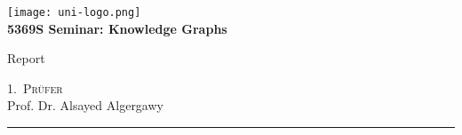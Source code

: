 \begin{titlepage}
    \centering
    \begin{onehalfspace}
    	
        	\texttt{[image: uni-logo.png]}\\
        	\vspace{1.0cm}
        	\large {\bfseries 5369S Seminar: Knowledge Graphs }\\

        	\vspace{2.5cm}

            \begin{doublespace}
            	{\textsf{\Huge{\thetitle}}}
            \end{doublespace}

        	\vspace{2cm}

            \Large{Report}\\

        	\vspace{1cm}

        	{\bfseries \large{\theauthor}}

        	\vfill

        	{\large
                \textsc{1.~Pr\"ufer} \\
                Prof. Dr. Alsayed Algergawy
        	}

        	\vspace{1.5cm}

        	\parbox{\linewidth}{\hrule\strut}

            \vfill

	    \thedate
    \end{onehalfspace}
\end{titlepage}
